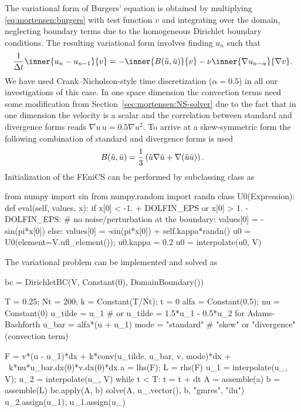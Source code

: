 The variational form of Burgers' equation is obtained by multiplying
\eqref{eq:mortensen:burgers} with test function $v$ and integrating over
the domain, neglecting boundary terms due to the homogeneous Dirichlet boundary
conditions. The resulting variational form involves finding $u_n$ such that
\begin{equation}
 \frac{1}{\Delta t}\inner{ u_{n} - u_{n-1}}{v}
      = - \inner{B(\tilde{u},\Bar{u})}{ v }
          - \nu \inner{ \nabla u_{n-\alpha}}{\nabla v }.
\label{eq:mortensen:burgers_vf}
\end{equation}
We have used Crank--Nicholson-style time discretization ($\alpha=0.5$)
in all our investigations of this case. In one space
dimension the convection terms need some modification from
Section~\ref{sec:mortensen:NS-solver} due to the fact that in one dimension the
velocity is a scalar and the correlation between standard and divergence
forms reads $\nabla u \, u =0.5 \nabla u^2$. To arrive at a skew-symmetric
form the following combination of standard and divergence forms is used
\begin{equation}
 B(\tilde{u},\Bar{u})
    = \frac{1}{3}\left( \tilde{u}\nabla \Bar{u}
      + \nabla (\tilde{u} \Bar{u}) \right).
\end{equation}
Initialization of the FEniCS  can be performed by
subclassing class  as
\begin{python}
from numpy import sin
from numpy.random import randn
class U0(Expression):
    def eval(self, values, x):
        if x[0] < -1. + DOLFIN_EPS or x[0] > 1. - DOLFIN_EPS:
            # no noise/perturbation at the boundary:
            values[0] = -sin(pi*x[0])
        else:
            values[0] = -sin(pi*x[0]) + self.kappa*randn()
u0 = U0(element=V.ufl_element()); u0.kappa = 0.2
u0 = interpolate(u0, V)
\end{python}
The variational problem can be implemented and solved as
\begin{python}
bc = DirichletBC(V, Constant(0), DomainBoundary())

T = 0.25; Nt = 200; k = Constant(T/Nt); t = 0
alfa = Constant(0.5); nu = Constant(0)
u_tilde = u_1 # or u_tilde = 1.5*u_1 - 0.5*u_2 for Adams-Bashforth
u_bar = alfa*(u + u_1)
mode = "standard"  # "skew" or "divergence" (convection term)

F = v*(u - u_1)*dx + k*conv(u_tilde, u_bar, v, mode)*dx + \
    k*nu*u_bar.dx(0)*v.dx(0)*dx
a = lhs(F); L = rhs(F)
u_1 = interpolate(u_, V); u_2 = interpolate(u_, V)
while t < T:
    t = t + dt
    A = assemble(a)
    b = assemble(L)
    bc.apply(A, b)
    solve(A, u_.vector(), b, "gmres", "ilu")
    u_2.assign(u_1); u_1.assign(u_)
\end{python}

